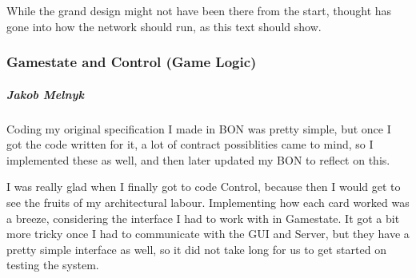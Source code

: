 While the grand design might not have been there from the start, thought has gone into how the network should run, as this text should show.

\subsubsection{Gamestate and Control (Game Logic)}
\subparagraph{Jakob Melnyk}
Coding my original specification I made in BON was pretty simple, but once I got the code written for it, a lot of contract possiblities came to mind, so I implemented these as well, and then later updated my BON to reflect on this.

I was really glad when I finally got to code Control, because then I would get to see the fruits of my architectural labour. Implementing how each card worked was a breeze, considering the interface I had to work with in Gamestate. It got a bit more tricky once I had to communicate with the GUI and Server, but they have a pretty simple interface as well, so it did not take long for us to get started on testing the system.